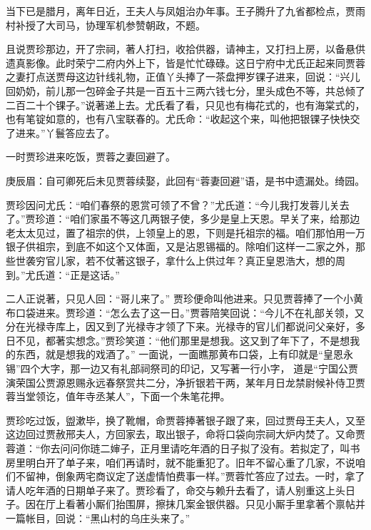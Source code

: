 \begin{parag}
    当下已是腊月，离年日近，王夫人与凤姐治办年事。王子腾升了九省都检点，贾雨村补授了大司马，协理军机参赞朝政，不题。
\end{parag}


\begin{parag}
    且说贾珍那边，开了宗祠，著人打扫，收拾供器，请神主，又打扫上房，以备悬供遗真影像。此时荣宁二府内外上下，皆是忙忙碌碌。这日宁府中尤氏正起来同贾蓉之妻打点送贾母这边针线礼物，正值丫头捧了一茶盘押岁锞子进来，回说：“兴儿回奶奶，前儿那一包碎金子共是一百五十三两六钱七分，里头成色不等，共总倾了二百二十个锞子。”说著递上去。尤氏看了看，只见也有梅花式的，也有海棠式的，也有笔锭如意的，也有八宝联春的。尤氏命：“收起这个来，叫他把银锞子快快交了进来。”丫鬟答应去了。
\end{parag}


\begin{parag}
    一时贾珍进来吃饭，贾蓉之妻回避了。\begin{note}庚辰眉：自可卿死后未见贾蓉续娶，此回有“蓉妻回避”语，是书中遗漏处。绮园。\end{note}贾珍因问尤氏：“咱们春祭的恩赏可领了不曾？”尤氏道：“今儿我打发蓉儿关去了。”贾珍道：“咱们家虽不等这几两银子使，多少是皇上天恩。早关了来，给那边老太太见过，置了祖宗的供，上领皇上的恩，下则是托祖宗的福。咱们那怕用一万银子供祖宗，到底不如这个又体面，又是沾恩锡福的。除咱们这样一二家之外，那些世袭穷官儿家，若不仗著这银子，拿什么上供过年？真正皇恩浩大，想的周到。”尤氏道：“正是这话。”
\end{parag}


\begin{parag}
    二人正说著，只见人回：“哥儿来了。” 贾珍便命叫他进来。只见贾蓉捧了一个小黄布口袋进来。贾珍道：“怎么去了这一日。”贾蓉陪笑回说：“今儿不在礼部关领，又分在光禄寺库上，因又到了光禄寺才领了下来。光禄寺的官儿们都说问父亲好，多日不见，都著实想念。”贾珍笑道：“他们那里是想我。这又到了年下了，不是想我的东西，就是想我的戏酒了。” 一面说，一面瞧那黄布口袋，上有印就是“皇恩永锡”四个大字，那一边又有礼部祠祭司的印记，又写著一行小字，
    道是“宁国公贾演荣国公贾源恩赐永远春祭赏共二分，净折银若干两，某年月日龙禁尉候补侍卫贾蓉当堂领讫，值年寺丞某人”，下面一个朱笔花押。
\end{parag}


\begin{parag}
    贾珍吃过饭，盥漱毕，换了靴帽，命贾蓉捧著银子跟了来，回过贾母王夫人，又至这边回过贾赦邢夫人，方回家去，取出银子，命将口袋向宗祠大炉内焚了。又命贾蓉道：“你去问问你琏二婶子，正月里请吃年酒的日子拟了没有。若拟定了，叫书房里明白开了单子来，咱们再请时，就不能重犯了。旧年不留心重了几家，不说咱们不留神，倒象两宅商议定了送虚情怕费事一样。”贾蓉忙答应了过去。一时，拿了请人吃年酒的日期单子来了。贾珍看了，命交与赖升去看了，请人别重这上头日子。因在厅上看著小厮们抬围屏，擦抹几案金银供器。只见小厮手里拿著个禀帖并一篇帐目，回说：“黑山村的乌庄头来了。”
\end{parag}


